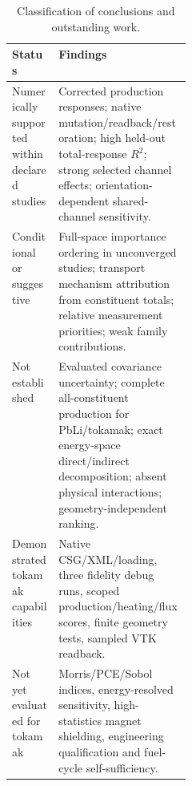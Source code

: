 \begin{table}[tbp]\centering\small
\caption{Classification of conclusions and outstanding work.}
\begin{tabularx}{\linewidth}{p{0.26\linewidth}X}
\toprule Status & Findings\\\midrule
Numerically supported within declared studies & Corrected production responses; native mutation/readback/restoration; high held-out total-response $R^2$; strong selected channel effects; orientation-dependent shared-channel sensitivity.\\
Conditional or suggestive & Full-space importance ordering in unconverged studies; transport mechanism attribution from constituent totals; relative measurement priorities; weak family contributions.\\
Not established & Evaluated covariance uncertainty; complete all-constituent production for PbLi/tokamak; exact energy-space direct/indirect decomposition; absent physical interactions; geometry-independent ranking.\\
Demonstrated tokamak capabilities & Native CSG/XML/loading, three fidelity debug runs, scoped production/heating/flux scores, finite geometry tests, sampled VTK readback.\\
Not yet evaluated for tokamak & Morris/PCE/Sobol indices, energy-resolved sensitivity, high-statistics magnet shielding, engineering qualification and fuel-cycle self-sufficiency.\\
\bottomrule
\end{tabularx}\end{table}
